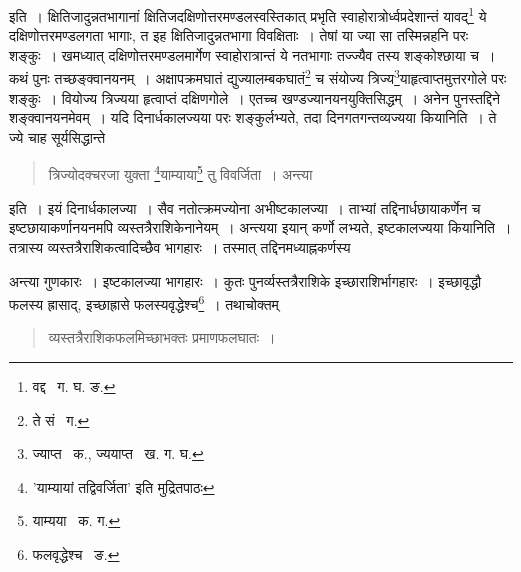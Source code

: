 \documentclass[11pt, openany]{book}
\begin{document}
\indent इति~। क्षितिजादुन्नतभागानां क्षितिजदक्षिणोत्तरमण्डलस्वस्तिकात् प्रभृति स्वाहोरात्रोर्ध्वप्रदेशान्तं यावद्\renewcommand{\thefootnote}{१}\footnote{वद्द \textendash\ ग. घ. ङ.} ये दक्षिणोत्तरमण्डलगता
भागाः, त इह क्षितिजादुन्नतभागा विवक्षिताः~। तेषां या ज्या सा तस्मिन्नहनि परः शङ्कुः~। खमध्यात् दक्षिणोत्तरमण्डलमार्गेण स्वाहोरात्रान्तं ये नतभागाः तज्ज्यैव तस्य शङ्कोश्छाया च~। कथं पुनः तच्छङ्क्वानयनम्~। अक्षापक्रमघातं द्युज्यालम्बकघातं\renewcommand{\thefootnote}{२}\footnote{ते सं \textendash\ ग.} च संयोज्य
त्रिज्य\renewcommand{\thefootnote}{३}\footnote{ज्याप्त \textendash\ क., ज्ययाप्त \textendash\ ख. ग. घ.}याहृत्वाप्तमुत्तरगोले 
परः शङ्कुः~। वियोज्य त्रिज्यया हृत्वाप्तं दक्षिणगोले~। एतच्च खण्डज्यानयनयुक्तिसिद्धम्~। अनेन पुनस्तद्दिने शङ्क्वानयनमेवम्~। यदि 
दिनार्धकालज्यया परः शङ्कुर्लभ्यते, तदा दिनगतगन्तव्यज्यया कियानिति~। ते ज्ये चाह सूर्यसिद्धान्ते\textendash 

\begin{quote} 
{\qt त्रिज्योदक्चरजा युक्ता \renewcommand{\thefootnote}{*}\footnote{'याम्यायां तद्विवर्जिता' इति मुद्रितपाठः}याम्याया\renewcommand{\thefootnote}{४}\footnote{याम्यया \textendash\ क. ग.} तु विवर्जिता~। अन्त्या}
\end{quote}
 
\noindent इति~। इयं दिनार्धकालज्या~। सैव नतोत्क्रमज्योना अभीष्टकालज्या~। ताभ्यां तद्दिनार्धछायाकर्णेन च इष्टछायाकर्णानयनमपि व्यस्तत्रैराशिकेनानेयम्~। अन्त्यया इयान् कर्णो लभ्यते, इष्टकालज्यया कियानिति~। तत्रास्य व्यस्तत्रैराशिकत्वादिच्छैव भागहारः~। तस्मात्
तद्दिनमध्याह्नकर्णस्य

\newpage

\noindent अन्त्या गुणकारः~। इष्टकालज्या भागहारः~। कुतः पुनर्व्यस्तत्रैराशिके इच्छाराशिर्भागहारः~। इच्छावृद्धौ फलस्य ह्रासाद्, इच्छाह्रासे फलस्यवृद्धेश्च\renewcommand{\thefootnote}{१}\footnote{फलवृद्धेश्च \textendash\ ङ.}~। तथाचोक्तम्\textendash 
 
\begin{quote} 
{\qt व्यस्तत्रैराशिकफलमिच्छाभक्तः प्रमाणफलघातः~।}
\end{quote} 
\end{document}
